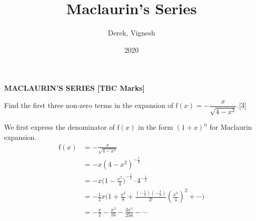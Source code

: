 \documentclass[12pt, a4 paper]{article}
\title{Maclaurin's Series}
\author{Derek, Vignesh}
\date{2020}
\begin{document}
\maketitle

\textbf{MACLAURIN'S SERIES [TBC Marks]}
\begin{outline}[enumerate]
 \1 Find the first three non-zero terms in the expansion of \(\textrm{f}(x)=-\dfrac{x}{\sqrt{4-x^2}}\).\hfill[3] %
 \begin{answer}
  We first express the denominator of \(\textrm{f}(x)\) in the form \({(1+x)}^n\) for Maclaurin expansion.
  \begin{align*}
   \textrm{f}(x) & =-\frac{x}{\sqrt{4-x^2}}                                                                                                                    \\
                 & = -x{(4-x^2)}^{-\frac{1}{2}}                                                                                                                \\
                 & = -x{\Big(1-\frac{x^2}{4}\Big)}^{-\frac{1}{2}}\cdot{4}^{-\frac{1}{2}}                                                                       \\
                 & = -\frac{1}{2}x\Big(1+\frac{x^2}{8}+\frac{\left(-\frac{1}{2}\right)\left(-\frac{3}{2}\right)}{2!}{\left(\frac{x^2}{4}\right)}^2+\cdots\Big) \\
                 & = -\frac{x}{2} - \frac{x^3}{16} - \frac{3x^5}{256} - \cdots
  \end{align*}
 \end{answer}


\end{outline}
\end{document}
